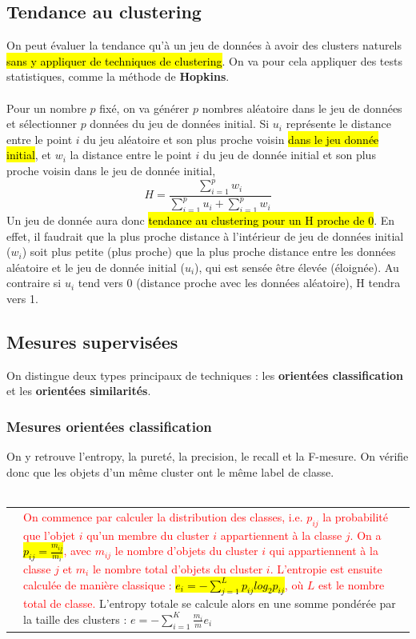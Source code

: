 \documentclass[letterpaper, 12pt]{article}
\newcommand{\alinea}{
\hspace*{0.5cm}}
\newcommand{\red}[1]{
	\textcolor{red}{#1}}
\newcommand{\myul}[1]{
		\underline{\smash{#1}}
	}
\begin{document}
		\subsection{Tendance au clustering}
			\alinea On peut évaluer la tendance qu'à un jeu de données à 
				avoir des clusters naturels \hl{sans y appliquer de 
				techniques de clustering}. On va pour cela appliquer
				des tests statistiques, comme la méthode de \textbf{Hopkins}.\\
			~\\
			\alinea Pour un nombre $p$ fixé, on va générer $p$ nombres
				aléatoire dans le jeu de données et sélectionner
				$p$ données du jeu de données initial. Si $u_i$ représente
				le distance entre le point $i$ du jeu aléatoire et son
				plus proche voisin \hl{dans le jeu donnée initial}, et $w_i$
				la distance entre le point $i$ du jeu de donnée initial
				et son plus proche voisin dans le jeu de donnée initial,
				$$ H = \frac{\sum_{i=1}^{p} w_i}{\sum_{i=1}^{p} u_i +
												 \sum_{i=1}^{p} w_i} $$
				Un jeu de donnée aura donc \hl{tendance au clustering pour
				un H proche de 0}. En effet, il faudrait que la plus proche
				distance à l'intérieur de jeu de données initial ($w_i$)
				soit plus petite (plus proche) que la plus proche distance
				entre les données aléatoire et le jeu de donnée initial
				($u_i$), qui est sensée être élevée (éloignée). Au contraire
				si $u_i$ tend vers 0 (distance proche avec les données 
				aléatoire), H tendra vers 1.
		\subsection{Mesures supervisées}
			\alinea On distingue deux types principaux de techniques :
				les \textbf{orientées classification} et les 
				\textbf{orientées similarités}.
			\subsubsection{Mesures orientées classification}
				\alinea On y retrouve l'entropy, la pureté, la precision,
					le recall et la F-mesure. On vérifie donc que 
					les objets d'un même cluster ont le même label de
					classe.\\~\\
				\begin{tabular}{lp{15.25cm}}
					\myul{\textbf{\hl{Entropy}}} & 
						\red{On commence par calculer la distribution
							 des classes, i.e. $p_{ij}$ la probabilité
							 que l'objet $i$ qu'un membre du cluster $i$
							 appartiennent à la classe $j$. On a 
							 \hl{$p_{ij} = \frac{m_{ij}}{m_i}$}, 
							 avec $m_{ij}$
							 le nombre d'objets du cluster $i$ qui
							 appartiennent à la classe $j$ et $m_i$ le
							 nombre total d'objets du cluster $i$.
							 L'entropie est ensuite calculée de manière
							 classique : 
							 \hl{$e_i = -\sum_{j=1}^{L} p_{ij} log_2 p_{ij}$},
							 où $L$ est le nombre total de classe.} L'entropy
							 totale se calcule alors en une somme pondérée
							 par la taille des clusters :
							 $e = -\sum_{i=1}^{K} \frac{m_i}{m} e_{i}$
				\end{tabular}
			\newpage
\end{document}
